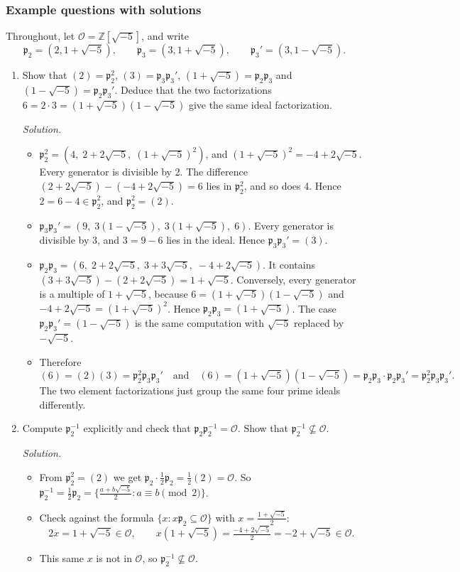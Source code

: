 \documentclass[11pt]{article}
\newcommand{\Z}{\mathbb{Z}}
\newcommand{\cO}{\mathcal{O}}
\newcommand{\fp}{\mathfrak{p}}
\begin{document}
\subsubsection*{Example questions with solutions}
Throughout, let $\cO=\Z[\sqrt{-5}]$, and write
\[
\fp_2=(2,1+\sqrt{-5}),\qquad \fp_3=(3,1+\sqrt{-5}),\qquad \fp_3'=(3,1-\sqrt{-5}).
\]

\begin{enumerate}[label=\textbf{Q2.\arabic*}]
  \item Show that $(2)=\fp_2^2$, $(3)=\fp_3\fp_3'$, $(1+\sqrt{-5})=\fp_2\fp_3$ and $(1-\sqrt{-5})=\fp_2\fp_3'$. Deduce that the two factorizations $6=2\cdot3=(1+\sqrt{-5})(1-\sqrt{-5})$ give the same ideal factorization.

  \textit{Solution.}
  \begin{itemize}
    \item $\fp_2^2=(4,\;2+2\sqrt{-5},\;(1+\sqrt{-5})^2)$, and $(1+\sqrt{-5})^2=-4+2\sqrt{-5}$. Every generator is divisible by 2. The difference $(2+2\sqrt{-5})-(-4+2\sqrt{-5})=6$ lies in $\fp_2^2$, and so does 4. Hence $2=6-4\in\fp_2^2$, and $\fp_2^2=(2)$.
    \item $\fp_3\fp_3'=(9,\;3(1-\sqrt{-5}),\;3(1+\sqrt{-5}),\;6)$. Every generator is divisible by 3, and $3=9-6$ lies in the ideal. Hence $\fp_3\fp_3'=(3)$.
    \item $\fp_2\fp_3=(6,\;2+2\sqrt{-5},\;3+3\sqrt{-5},\;-4+2\sqrt{-5})$. It contains $(3+3\sqrt{-5})-(2+2\sqrt{-5})=1+\sqrt{-5}$. Conversely, every generator is a multiple of $1+\sqrt{-5}$, because $6=(1+\sqrt{-5})(1-\sqrt{-5})$ and $-4+2\sqrt{-5}=(1+\sqrt{-5})^2$. Hence $\fp_2\fp_3=(1+\sqrt{-5})$. The case $\fp_2\fp_3'=(1-\sqrt{-5})$ is the same computation with $\sqrt{-5}$ replaced by $-\sqrt{-5}$.
    \item Therefore
    \[
    (6)=(2)(3)=\fp_2^2\fp_3\fp_3' \quad\text{and}\quad (6)=(1+\sqrt{-5})(1-\sqrt{-5})=\fp_2\fp_3\cdot\fp_2\fp_3'=\fp_2^2\fp_3\fp_3'.
    \]
    The two element factorizations just group the same four prime ideals differently.
  \end{itemize}

  \item Compute $\fp_2^{-1}$ explicitly and check that $\fp_2\fp_2^{-1}=\cO$. Show that $\fp_2^{-1}\not\subseteq\cO$.

  \textit{Solution.}
  \begin{itemize}
    \item From $\fp_2^2=(2)$ we get $\fp_2\cdot\tfrac12\fp_2=\tfrac12(2)=\cO$. So $\fp_2^{-1}=\tfrac12\fp_2=\bigl\{\tfrac{a+b\sqrt{-5}}{2}: a\equiv b\pmod2\bigr\}$.
    \item Check against the formula $\{x: x\fp_2\subseteq\cO\}$ with $x=\frac{1+\sqrt{-5}}2$:
    \[
    2x=1+\sqrt{-5}\in\cO,\qquad x(1+\sqrt{-5})=\tfrac{-4+2\sqrt{-5}}{2}=-2+\sqrt{-5}\in\cO.
    \]
    \item This same $x$ is not in $\cO$, so $\fp_2^{-1}\not\subseteq\cO$.
  \end{itemize}


\end{enumerate}
\end{document}
